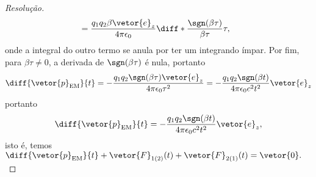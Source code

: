 \begin{proof}[Resolução]
\begin{align*}
                                      &= \frac{q_1 q_2 \beta \vetor{e}_z}{4\pi \epsilon_0} \diff*{\frac{\sgn(\beta \tau)}{\beta \tau}}{\tau},
   \end{align*}
   onde a integral do outro termo se anula por ter um integrando ímpar. Por fim, para \(\beta \tau \neq 0\), a derivada de \(\sgn(\beta \tau)\) é nula, portanto
   \begin{equation*}
      \diff{\vetor{p}_\mathrm{EM}}{t} = -\frac{q_1 q_2 \sgn(\beta \tau)\vetor{e}_z}{4\pi \epsilon_0 \tau^2} = - \frac{q_1q_2 \sgn(\beta t)}{4\pi \epsilon_0 c^2 t^2} \vetor{e}_z
   \end{equation*}
   portanto
   \begin{equation*}
      \diff{\vetor{p}_\mathrm{EM}}{t} = -\frac{q_1 q_2 \sgn(\beta t)}{4\pi \epsilon_0 c^2 t^2} \vetor{e}_z,
   \end{equation*}
   isto é, temos \(\diff{\vetor{p}_\mathrm{EM}}{t} + \vetor{F}_{1(2)}(t) + \vetor{F}_{2(1)}(t) = \vetor{0}.\)
\end{proof}

